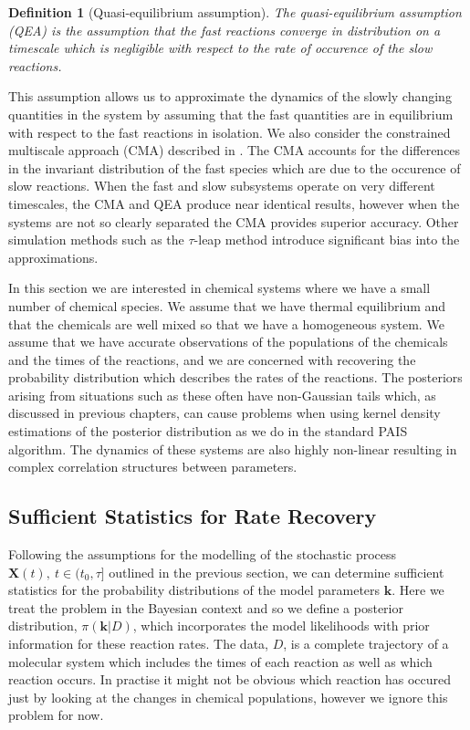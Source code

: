 \documentclass[final]{siamltex}
\newtheorem{dfn}{Definition}[section]
\begin{document}
\begin{dfn}[Quasi-equilibrium assumption]
	The quasi-equilibrium assumption (QEA) is the assumption that the fast reactions converge in distribution on a timescale which is negligible with respect to the rate of occurence of the slow reactions.
\end{dfn}

This assumption allows us to approximate the dynamics of the slowly changing quantities in the system by assuming that the fast quantities are in equilibrium with respect to the fast reactions in isolation. We also consider the constrained multiscale approach (CMA) described in \cite{cotter2011constrained,cotter2016constrained}. The CMA accounts for the differences in the invariant distribution of the fast species which are due to the occurence of slow reactions. When the fast and slow subsystems operate on very different timescales, the CMA and QEA produce near identical results, however when the systems are not so clearly separated the CMA provides superior accuracy. Other simulation methods such as the $\tau$-leap method introduce significant bias into the approximations.

In this section we are interested in chemical systems where we have a small number of chemical species. We assume that we have thermal equilibrium and that the chemicals are well mixed so that we have a homogeneous system. We assume that we have accurate observations of the populations of the chemicals and the times of the reactions, and we are concerned with recovering the probability distribution which describes the rates of the reactions. The posteriors arising from situations such as these often have non-Gaussian tails which, as discussed in previous chapters, can cause problems when using kernel density estimations of the posterior distribution as we do in the standard PAIS algorithm. The dynamics of these systems are also highly non-linear resulting in complex correlation structures between parameters.


\subsection{Sufficient Statistics for Rate Recovery}

Following the assumptions for the modelling of the stochastic process $\mathbf{X}(t),\ t \in (t_0, \tau]$ outlined in the previous section, we can determine sufficient statistics for the probability distributions of the model parameters $\mathbf{k}$. Here we treat the problem in the Bayesian context and so we define a posterior distribution, $\pi(\mathbf{k}|D)$, which incorporates the model likelihoods with prior information for these reaction rates. The data, $D$, is a complete trajectory of a molecular system which includes the times of each reaction as well as which reaction occurs. In practise it might not be obvious which reaction has occured just by looking at the changes in chemical populations, however we ignore this problem for now.
\end{document}
